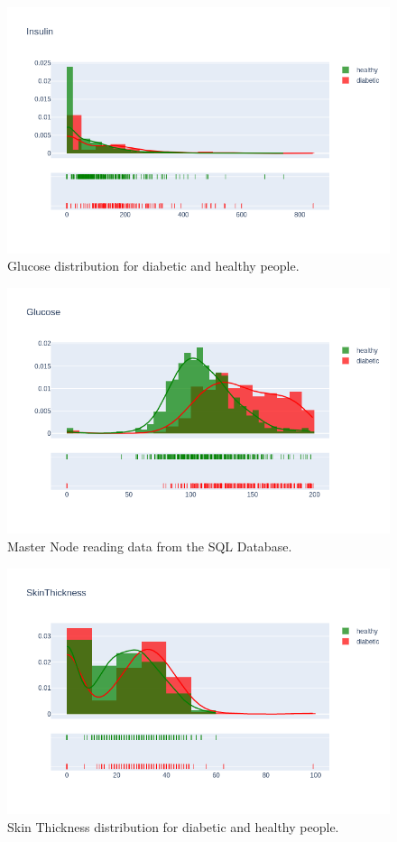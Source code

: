 \documentclass[12pt]{article}
\begin{document}
\begin{figure}[ht]
\centering
\includegraphics[width=1\textwidth]{newplot(4).png}
\caption{Glucose distribution for diabetic and healthy people.}
\end{figure}

\begin{figure}[ht]
\centering
\includegraphics[width=1\textwidth]{newplot(5).png}
\caption{Master Node reading data from the SQL Database.}
\end{figure}

\begin{figure}[ht]
\centering
\includegraphics[width=1\textwidth]{newplot(6).png}
\caption{Skin Thickness distribution for diabetic and healthy people.}
\end{figure}
\end{document}
